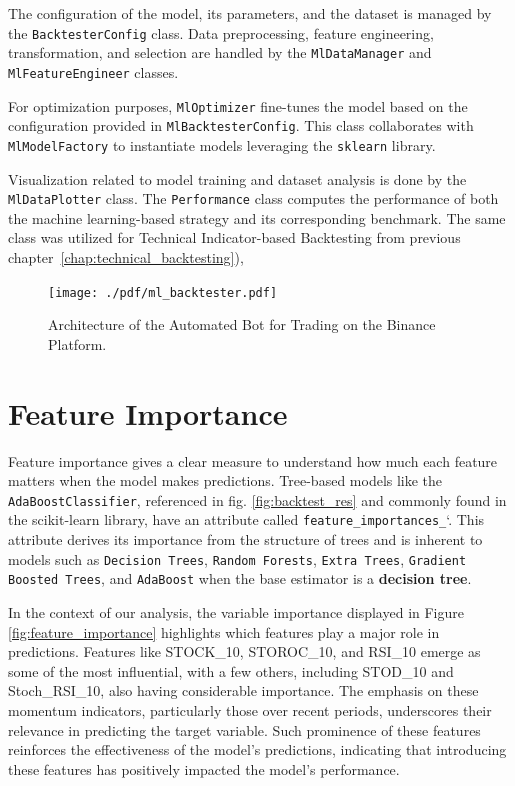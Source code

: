 The configuration of the model, its parameters, and the dataset is managed by the \texttt{BacktesterConfig} class.
Data preprocessing, feature engineering, transformation, and selection are handled by the \texttt{MlDataManager} and \texttt{MlFeatureEngineer} classes.

For optimization purposes, \texttt{MlOptimizer} fine-tunes the model based on the configuration provided in \texttt{MlBacktesterConfig}.
This class collaborates with \texttt{MlModelFactory} to instantiate models leveraging the \texttt{sklearn} library.

Visualization related to model training and dataset analysis is done by the \texttt{MlDataPlotter} class.
The \texttt{Performance} class computes the performance of both the machine learning-based strategy and its corresponding benchmark. The same class was utilized for Technical Indicator-based Backtesting from previous chapter~\ref{chap:technical_backtesting}),

\begin{figure}[H]
\centering
\texttt{[image: ./pdf/ml\_backtester.pdf]}
\caption{Architecture of the Automated Bot for Trading on the Binance Platform.}
\label{fig:ml_backtester}
\end{figure}

\noindent


\section{Feature Importance}

Feature importance gives a clear measure to understand how much each feature matters when the model makes predictions.
Tree-based models like the  \texttt{AdaBoostClassifier}, referenced in fig. \ref{fig:backtest_res} and commonly found in the scikit-learn library, have an attribute called  \texttt{feature\_importances\_}`.
This attribute derives its importance from the structure of trees and is inherent to models such as  \texttt{Decision Trees},  \texttt{Random Forests},  \texttt{Extra Trees},  \texttt{Gradient Boosted Trees}, and  \texttt{AdaBoost} when the base estimator is a \textbf{decision tree}.

In the context of our analysis, the variable importance displayed in Figure \ref{fig:feature_importance} highlights which features play a major role in predictions.
Features like STOCK\_10, STOROC\_10, and RSI\_10 emerge as some of the most influential, with a few others, including STOD\_10 and Stoch\_RSI\_10, also having considerable importance.
The emphasis on these momentum indicators, particularly those over recent periods, underscores their relevance in predicting the target variable.
Such prominence of these features reinforces the effectiveness of the model's predictions, indicating that introducing these features has positively impacted the model's performance.

